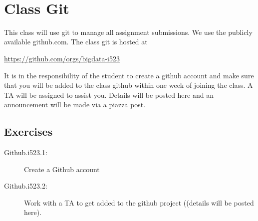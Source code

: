 \FILENAME\

\section{Class Git}\label{class-git}

This class will use git to manage all assignment submissions. We use the
publicly available github.com. The class git is hosted at

\url{https://github.com/orgs/bigdata-i523}

It is in the responsibility of the student to create a github account
and make sure that you will be added to the class github within one week
of joining the class. A TA will be assigned to assist you. Details will
be posted here and an announcement will be made via a piazza post.

\subsection{Exercises}

\begin{description}
\item[Github.i523.1:]
Create a Github account
\item[Github.i523.2:]
Work with a TA to get added to the github project ((details will be
posted here).
\end{description}
